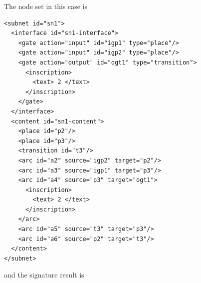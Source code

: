 The node set in this case is

\begin{lstlisting}[basicstyle=\ttfamily\tiny]
<subnet id="sn1">
  <interface id="sn1-interface">
    <gate action="input" id="igp1" type="place"/>
    <gate action="input" id="igp2" type="place"/>
    <gate action="output" id="ogt1" type="transition">
      <inscription>
        <text> 2 </text>
      </inscription>
    </gate>
  </interface>
  <content id="sn1-content">
    <place id="p2"/>
    <place id="p3"/>
    <transition id="t3"/>
    <arc id="a2" source="igp2" target="p2"/>
    <arc id="a3" source="igp1" target="p3"/>
    <arc id="a4" source="p3" target="ogt1">
      <inscription>
        <text> 2 </text>
      </inscription>
    </arc>
    <arc id="a5" source="t3" target="p3"/>
    <arc id="a6" source="p2" target="t3"/>
  </content>
</subnet>
\end{lstlisting}

and the signature result is

